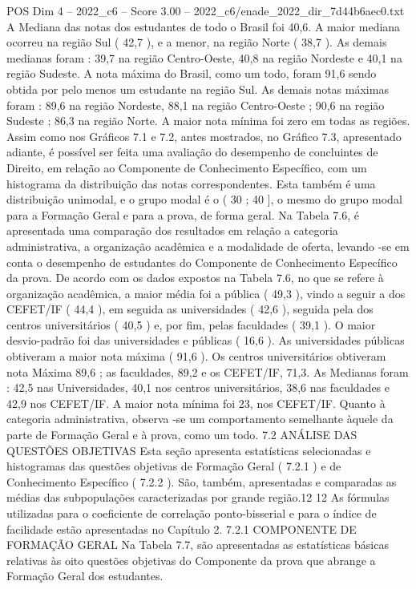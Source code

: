 \begin{textsample}{POS Dim 4 – 2022\_c6 – Score 3.00 – 2022\_c6/enade\_2022\_dir\_7d44b6aec0.txt}
A Mediana das notas dos estudantes de todo o Brasil foi 40,6.
A maior mediana ocorreu na região Sul ( 42,7 ), e a menor, na região Norte ( 38,7 ).
As demais medianas foram : 39,7 na região Centro-Oeste, 40,8 na região Nordeste e 40,1 na região Sudeste.
A nota máxima do Brasil, como um todo, foram 91,6 sendo obtida por pelo menos um estudante na região Sul.
As demais notas máximas foram : 89,6 na região Nordeste, 88,1 na região Centro-Oeste ; 90,6 na região Sudeste ; 86,3 na região Norte.
A maior nota mínima foi zero em todas as regiões.
Assim como nos Gráficos 7.1 e 7.2, antes mostrados, no Gráfico 7.3, apresentado adiante, é possível ser feita uma avaliação do desempenho de concluintes de Direito, em relação ao Componente de Conhecimento Específico, com um histograma da distribuição das notas correspondentes.
Esta também é uma distribuição unimodal, e o grupo modal é o ( 30 ; 40 ], o mesmo do grupo modal para a Formação Geral e para a prova, de forma geral.
Na Tabela 7.6, é apresentada uma comparação dos resultados em relação a categoria administrativa, a organização acadêmica e a modalidade de oferta, levando -se em conta o desempenho de estudantes do Componente de Conhecimento Específico da prova.
De acordo com os dados expostos na Tabela 7.6, no que se refere à organização acadêmica, a maior média foi a pública ( 49,3 ), vindo a seguir a dos CEFET/IF ( 44,4 ), em seguida as universidades ( 42,6 ), seguida pela dos centros universitários ( 40,5 ) e, por fim, pelas faculdades ( 39,1 ).
O maior desvio-padrão foi das universidades e públicas ( 16,6 ).
As universidades públicas obtiveram a maior nota máxima ( 91,6 ).
Os centros universitários obtiveram nota Máxima 89,6 ; as faculdades, 89,2 e os CEFET/IF, 71,3.
As Medianas foram : 42,5 nas Universidades, 40,1 nos centros universitários, 38,6 nas faculdades e 42,9 nos CEFET/IF.
A maior nota mínima foi 23, nos CEFET/IF.
Quanto à categoria administrativa, observa -se um comportamento semelhante àquele da parte de Formação Geral e à prova, como um todo. 7.2 ANÁLISE DAS QUESTÕES OBJETIVAS Esta seção apresenta estatísticas selecionadas e histogramas das questões objetivas de Formação Geral ( 7.2.1 ) e de Conhecimento Específico ( 7.2.2 ).
São, também, apresentadas e comparadas as médias das subpopulações caracterizadas por grande região.12 12 As fórmulas utilizadas para o coeficiente de correlação ponto-bisserial e para o índice de facilidade estão apresentadas no Capítulo 2. 7.2.1 COMPONENTE DE FORMAÇÃO GERAL Na Tabela 7.7, são apresentadas as estatísticas básicas relativas às oito questões objetivas do Componente da prova que abrange a Formação Geral dos estudantes.

\end{textsample}
